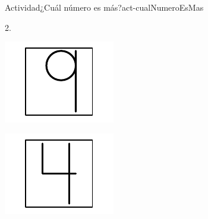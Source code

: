 \documentclass[20pt]{extarticle}
\begin{document}
\begin{activity}{Actividad}{¿Cuál número es más?}{act-cualNumeroEsMas}
\begin{image}{0}{1}{0}{}
\end{image}%
2.%
\begin{sidebyside}{2}{0}{0}{0}%
\begin{sbspanel}{0.5}%
\includegraphics[max width=\linewidth, center]{external/svg-source/tikz-file-148548.pdf}
\end{sbspanel}%
\begin{sbspanel}{0.5}%
\includegraphics[max width=\linewidth, center]{external/svg-source/tikz-file-148549.pdf}
\end{sbspanel}%
\end{sidebyside}%
\end{activity}
\end{document}
